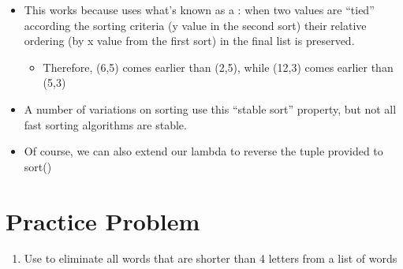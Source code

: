 \documentclass[letterpaper,10pt,english]{sphinxmanual}
\begin{document}
\begin{itemize}
\item {} 
This works because  uses what’s known as a :  when two values are “tied” according the
sorting criteria (y value in the second sort) their relative
ordering (by x value from the first sort) in the final list is preserved.
\begin{itemize}
\item {} 
Therefore, (6,5) comes earlier than (2,5), while (12,3) comes
earlier than (5,3)

\end{itemize}

\item {} 
A number of variations on sorting use this “stable sort” property,
but not all fast sorting algorithms are stable.

\item {} 
Of course, we can also extend our lambda to reverse the tuple provided to sort()

%
\begin{sphinxVerbatim}[commandchars=\\\{\}]
       \PYG{p}{[}\PYG{p}{]} \PYG{p}{[}\PYG{p}{]} 
\PYG{p}{[}            \PYGZbs{}
      \PYG{p}{]}
\end{sphinxVerbatim}

\end{itemize}


\section{Practice Problem}
\label{\detokenize{lecture_notes/lec24_functional:practice-problem}}\begin{enumerate}
\item {} 
Use  to eliminate all words that are shorter than 4
letters from a list of words

\end{enumerate}
\end{document}
